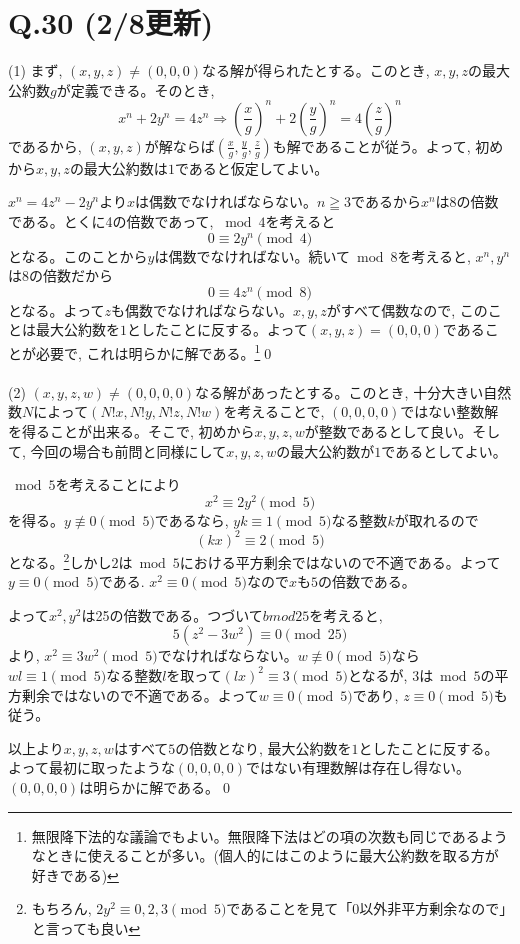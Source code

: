 \documentclass[twocolumn]{jbook}
\newcommand{\nara}{\Rightarrow}
\renewcommand{\geq}{\geqq}
\newcommand{\parena}[1]{\left( #1\right)}
\begin{document}
\section*{Q.30 (2/8更新)}
(1) まず, $(x,y,z)\neq (0,0,0)$なる解が得られたとする。このとき, $x,y,z$の最大公約数$g$が定義できる。そのとき, 
\[x^n + 2y^n = 4z^n \nara \parena{\dfrac{x}{g}}^n + 2\parena{\dfrac{y}{g}}^n = 4\parena{\dfrac{z}{g}}^n \]
であるから, $(x,y,z)$が解ならば$(\frac{x}{g}, \frac{y}{g}, \frac{z}{g})$も解であることが従う。よって, 初めから$x,y,z$の最大公約数は$1$であると仮定してよい。\par
 $x^n = 4z^n - 2y^n$より$x$は偶数でなければならない。$n\geq 3$であるから$x^n$は$8$の倍数である。とくに4の倍数であって, $\bmod{4}$を考えると
\[0 \equiv 2y^n\pmod{4}\]
となる。このことから$y$は偶数でなければない。続いて$\bmod{8}$を考えると, $x^n,y^n$は$8$の倍数だから
\[0\equiv 4z^n\pmod{8}\]
となる。よって$z$も偶数でなければならない。$x,y,z$がすべて偶数なので, このことは最大公約数を$1$としたことに反する。よって$(x,y,z) = (0,0,0)$であることが必要で, これは明らかに解である。\footnote{無限降下法的な議論でもよい。無限降下法はどの項の次数も同じであるようなときに使えることが多い。(個人的にはこのように最大公約数を取る方が好きである)}\qed\\
\\
(2) $(x,y,z,w) \neq (0,0,0,0)$なる解があったとする。このとき, 十分大きい自然数$N$によって$(N!x, N!y, N!z, N!w)$を考えることで, $(0,0,0,0)$ではない整数解を得ることが出来る。そこで, 初めから$x,y,z,w$が整数であるとして良い。そして, 今回の場合も前問と同様にして$x,y,z,w$の最大公約数が$1$であるとしてよい。\par
$\bmod{5}$を考えることにより
\[x^2 \equiv 2y^2\pmod{5}\]
を得る。$y\not\equiv 0\pmod{5}$であるなら, $yk\equiv 1\pmod{5}$なる整数$k$が取れるので
\[(kx)^2 \equiv 2\pmod{5}\]
となる。\footnote{もちろん, $2y^2\equiv 0,2,3\pmod{5}$であることを見て「$0$以外非平方剰余なので」と言っても良い}しかし$2$は$\bmod{5}$における平方剰余ではないので不適である。よって$y\equiv 0\pmod{5}$である. $x^2 \equiv 0\pmod{5}$なので$x$も$5$の倍数である。\par
よって$x^2, y^2$は25の倍数である。つづいて$bmod{25}$を考えると, 
\[5(z^2 - 3w^2)\equiv 0\pmod{25}\]
より, $x^2 \equiv 3w^2 \pmod{5}$でなければならない。$w\not\equiv 0\pmod{5}$なら$wl\equiv 1\pmod{5}$なる整数$l$を取って$(lx)^2\equiv 3\pmod{5}$となるが, $3$は$\bmod{5}$の平方剰余ではないので不適である。よって$w\equiv 0\pmod{5}$であり, $z\equiv 0\pmod{5}$も従う。\par
以上より$x,y,z,w$はすべて$5$の倍数となり, 最大公約数を$1$としたことに反する。よって最初に取ったような$(0,0,0,0)$ではない有理数解は存在し得ない。$(0,0,0,0)$は明らかに解である。\qed
\end{document}
